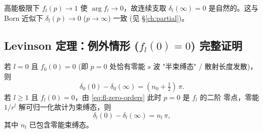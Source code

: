 \begin{remark}[$\delta_l(\infty)=0$ 约定的合法性]\label{rem:anlyt-delta-inf}
高能极限下 $f_l(p)\to 1$ 使 $\arg f_l\to 0$，故连续支取
$\delta_l(\infty)=0$ 是自然的。这与 Born 近似下 $\delta_l(p)\to 0$
($p\to\infty$) 一致 (见 \S\ref{ch:partial})。
\end{remark}

\subsection{Levinson 定理：例外情形 ($f_l(0)=0$) 完整证明}
\label{ssec:anlyt-levinson-exceptional}

\begin{theorem*}[Levinson 定理，$f_l(0)=0$ 例外情形]
若 $l=0$ 且 $f_0(0)=0$ (即 $p=0$ 处恰有零能 $s$ 波 "半束缚态" / 散射长度发散)，
则
\begin{equation}
\delta_0(0)-\delta_0(\infty) = (n_0+\tfrac{1}{2})\,\pi.
\label{eq:anlyt-levinson-l0}
\end{equation}
若 $l\geq 1$ 且 $f_l(0)=0$，由 \eqref{eq:fl-zero-orders} 此时 $p=0$ 是 $f_l$ 的二阶
零点，零能 $1/r^l$ 解可归一化故计为束缚态，则
\begin{equation}
\delta_l(0)-\delta_l(\infty) = n_l\,\pi,
\label{eq:anlyt-levinson-lge1}
\end{equation}
其中 $n_l$ 已包含零能束缚态。
\end{theorem*}

